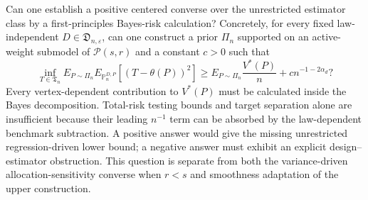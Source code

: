 Can one establish a positive centered converse over the unrestricted estimator class by a first-principles Bayes-risk calculation?  Concretely, for every fixed law-independent \(D\in\mathfrak D_{n,\varepsilon}\), can one construct a prior \(\Pi_n\) supported on an active-weight submodel of \(\mathcal P(s,r)\) and a constant \(c>0\) such that
\[
\inf_{T\in\mathfrak T_n}
E_{P\sim\Pi_n}E_{\mathbb P_n^{D,P}}[(T-\theta(P))^2]
\geq E_{P\sim\Pi_n}\frac{V^*(P)}n
+c n^{-1-2\alpha_d}?
\]
Every vertex-dependent contribution to \(V^*(P)\) must be calculated inside the Bayes decomposition.  Total-risk testing bounds and target separation alone are insufficient because their leading \(n^{-1}\) term can be absorbed by the law-dependent benchmark subtraction.  A positive answer would give the missing unrestricted regression-driven lower bound; a negative answer must exhibit an explicit design--estimator obstruction.  This question is separate from both the variance-driven allocation-sensitivity converse when \(r<s\) and smoothness adaptation of the upper construction.